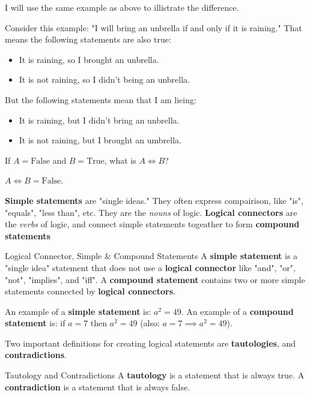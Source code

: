 I will use the same example as above to illistrate the difference.

\begin{boxexample}{}{}
	Consider this example: "I will bring an unbrella if and only if it is raining." That means the following statements are also true:
	\begin{itemize}
		\item It is raining, so I brought an unbrella.
		\item It is not raining, so I didn't being an unbrella.
	\end{itemize}
	But the following statements mean that I am lieing:
	\begin{itemize}
		\item It is raining, but I didn't bring an unbrella.
		\item It is not raining, but I brought an umbrella.
	\end{itemize}
\end{boxexample}

\begin{boxexample}{}{}
	If $A=\text{False}$ and $B=\text{True}$, what is $A \iff B$?
	
	$A \iff B = \text{False}$.
\end{boxexample}

{\bf Simple statements} are "single ideas." They often express compairison, like "is", "equals", "less than", etc. They are the \emph{nouns} of logic. {\bf Logical connectors} are the \emph{verbs} of logic, and connect simple statements togeather to form {\bf compound statements}

\begin{boxdefine}{Logical Connector, Simple \& Compound Statements}{}
	A {\bf simple statement} is a "single idea" statement that does not use a {\bf logical connector} like "and", "or", "not", "implies", and "iff".
	A {\bf compound statement} contains two or more simple statements connected by {\bf logical connectors}.
\end{boxdefine}

\begin{boxexample}{}{}
	An example of a {\bf simple statement} is: $a^2=49$. An example of a {\bf compound statement} is: if $a=7$ then $a^2=49$ (also: $a=7 \implies a^2=49$). 
\end{boxexample}

Two important definitions for creating logical statements are {\bf tautologies}, and {\bf contradictions}.

\begin{boxdefine}{Tautology and Contradictions}{}
	A {\bf tautology} is a statement that is always true. A {\bf contradiction} is a statement that is always false.
\end{boxdefine}
